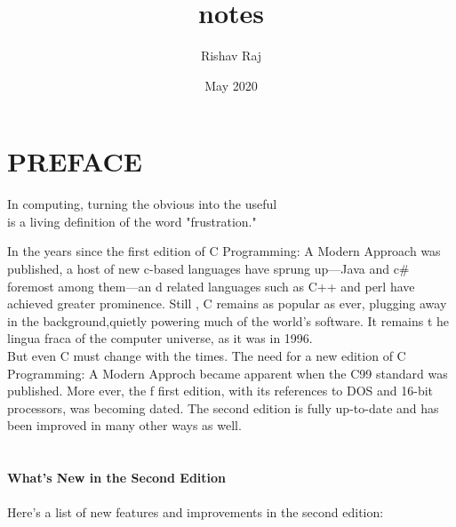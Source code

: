 \documentclass{article}
\title{notes}
\author{Rishav Raj}
\date{May 2020}
\begin{document}
 
 
 
 \section*{PREFACE}
 
 \begin{flushright}In computing, turning the obvious into the useful \\ is a living definition of the word "frustration." \end{flushright}
 

 
 In the years since the first edition of C Programming: A Modern Approach was published, a host of new c-based languages have sprung up---Java and c\# foremost among them---an
 d related languages such as C++
 and perl have achieved greater prominence. Still , C remains as popular as ever, plugging away in the background,quietly powering much of the world's software. It remains t
 he lingua fraca of the computer universe, as it was in 1996. \\
    But even C must change with the times. The need for a new edition of C Programming: A Modern Approch became apparent when the C99 standard was published. More ever, the f
 first edition, with its references to DOS and 16-bit processors, was becoming dated. The second edition is fully up-to-date and has been improved in many other ways as well.
 \\
    \\
     \\
    \textbf{What's New in the Second Edition}\\
    \\
    Here's a list of new features and improvements in the second edition:
\end{document}
